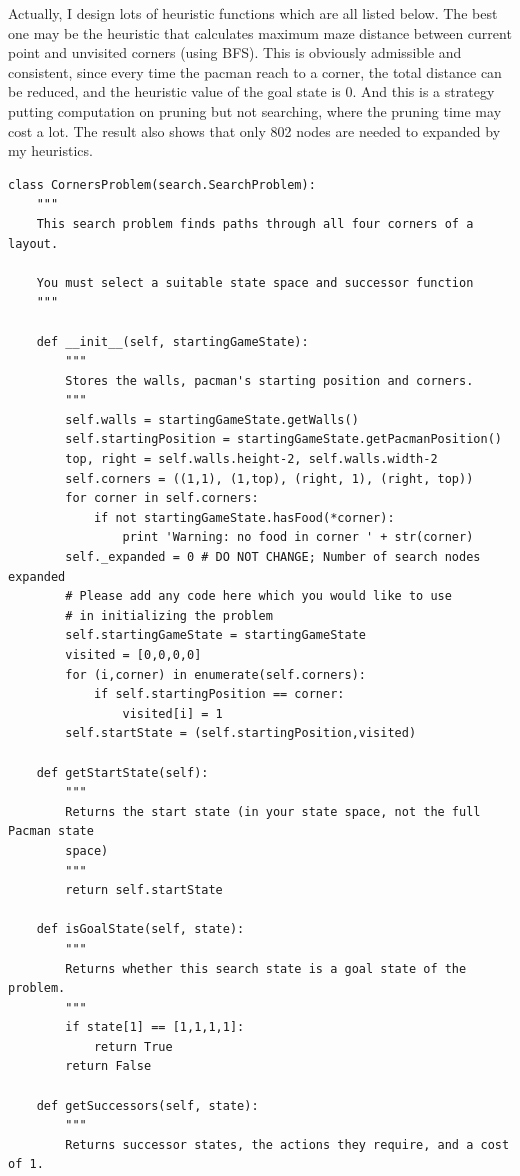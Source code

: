 \documentclass[a4paper, 11pt]{article}
\begin{document}
Actually, I design lots of heuristic functions which are all listed below.
The best one may be the heuristic that calculates maximum maze distance between current point and unvisited corners (using BFS).
This is obviously admissible and consistent, since every time the pacman reach to a corner, the total distance can be reduced, and the heuristic value of the goal state is 0.
And this is a strategy putting computation on pruning but not searching, where the pruning time may cost a lot.
The result also shows that only 802 nodes are needed to expanded by my heuristics.

\begin{lstlisting}
class CornersProblem(search.SearchProblem):
    """
    This search problem finds paths through all four corners of a layout.

    You must select a suitable state space and successor function
    """

    def __init__(self, startingGameState):
        """
        Stores the walls, pacman's starting position and corners.
        """
        self.walls = startingGameState.getWalls()
        self.startingPosition = startingGameState.getPacmanPosition()
        top, right = self.walls.height-2, self.walls.width-2
        self.corners = ((1,1), (1,top), (right, 1), (right, top))
        for corner in self.corners:
            if not startingGameState.hasFood(*corner):
                print 'Warning: no food in corner ' + str(corner)
        self._expanded = 0 # DO NOT CHANGE; Number of search nodes expanded
        # Please add any code here which you would like to use
        # in initializing the problem
        self.startingGameState = startingGameState
        visited = [0,0,0,0]
        for (i,corner) in enumerate(self.corners):
            if self.startingPosition == corner:
                visited[i] = 1
        self.startState = (self.startingPosition,visited)

    def getStartState(self):
        """
        Returns the start state (in your state space, not the full Pacman state
        space)
        """
        return self.startState

    def isGoalState(self, state):
        """
        Returns whether this search state is a goal state of the problem.
        """
        if state[1] == [1,1,1,1]:
            return True
        return False

    def getSuccessors(self, state):
        """
        Returns successor states, the actions they require, and a cost of 1.


\end{lstlisting}
\end{document}
